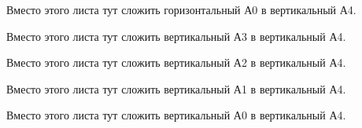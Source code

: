 \documentclass[12pt, a4paper, simple]{eskdtext}
\begin{document}
\newpage

Вместо этого листа тут сложить горизонтальный А0 в вертикальный А4.

\newpage

Вместо этого листа тут сложить вертикальный А3 в вертикальный А4.

\newpage

Вместо этого листа тут сложить вертикальный А2 в вертикальный А4.

\newpage

Вместо этого листа тут сложить вертикальный А1 в вертикальный А4.

\newpage

Вместо этого листа тут сложить вертикальный А0 в вертикальный А4.

\newpage
\end{document}
